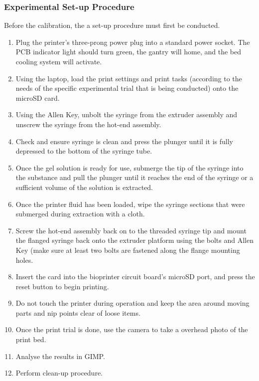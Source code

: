 \subsubsection*{Experimental Set-up Procedure}
Before the calibration, the a set-up procedure must first be conducted. 
\begin{enumerate}
    \item Plug the printer’s three-prong power plug into a standard power socket. The PCB indicator light should turn green, the gantry will home, and the bed cooling system will activate.
    \item Using the laptop, load the print settings and print tasks (according to the needs of the specific experimental trial that is being conducted) onto the microSD card.
    \item Using the Allen Key, unbolt the syringe from the extruder assembly and unscrew the syringe from the hot-end assembly.
    \item Check and ensure syringe is clean and press the plunger until it is fully depressed to the bottom of the syringe tube.
    \item Once the gel solution is ready for use, submerge the tip of the syringe into the substance and pull the plunger until it reaches the end of the syringe or a sufficient volume of the solution is extracted.
    \item Once the printer fluid has been loaded, wipe the syringe sections that were submerged during extraction with a cloth.
    \item Screw the hot-end assembly back on to the threaded syringe tip and mount the flanged syringe back onto the extruder platform using the bolts and Allen Key (make sure at least two bolts are fastened along the flange mounting holes.
    \item Insert the card into the bioprinter circuit board's microSD port, and press the reset button to begin printing.
    \item Do not touch the printer during operation and keep the area around moving parts and nip points clear of loose items.
    \item Once the print trial is done, use the camera to take a overhead photo of the print bed.
    \item Analyse the results in GIMP.
    \item Perform clean-up procedure.
\end{enumerate}

